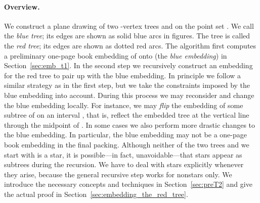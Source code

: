 \documentclass[11pt,a4paper,colorlinks=true,urlcolor=blue,citecolor=red]{article}
\theoremstyle{plain}
\newcommand{\subsubparagraph}[1]{\paragraph{#1}}
\begin{document}
\subsubparagraph{Overview.} We construct a plane drawing of two -vertex trees  and  on the point set
. We call  the \emph{blue tree}; its edges are shown as
solid blue arcs in figures. The tree  is called the \emph{red
  tree}; its edges are shown as dotted red arcs. The algorithm first
computes a preliminary one-page book embedding of  onto  (the
\emph{blue embedding}) in Section~\ref{sec:emb_t1}. In the second step
we recursively construct an embedding for the red tree to pair up with
the blue embedding. In principle we follow a similar strategy as in the
first step, but we take the constraints imposed by the blue embedding
into account. During this process we may reconsider and change the blue
embedding locally. For instance, we may \emph{flip} the embedding of
some subtree of  on an interval , that is, reflect the
embedded tree at the vertical line  through the
midpoint of . In some cases we also perform more drastic changes
to the blue embedding. In particular, the blue embedding may not be a
one-page book embedding in the final packing. Although neither of the
two trees  and  we start with is a star, it is possible---in
fact, unavoidable---that stars appear as subtrees during the recursion.
We have to deal with stars explicitly whenever they arise, because the
general recursive step works for nonstars only. We introduce the
necessary concepts and techniques in Section~\ref{sec:preT2} and give
the actual proof in Section~\ref{sec:embedding_the_red_tree}.
\end{document}
